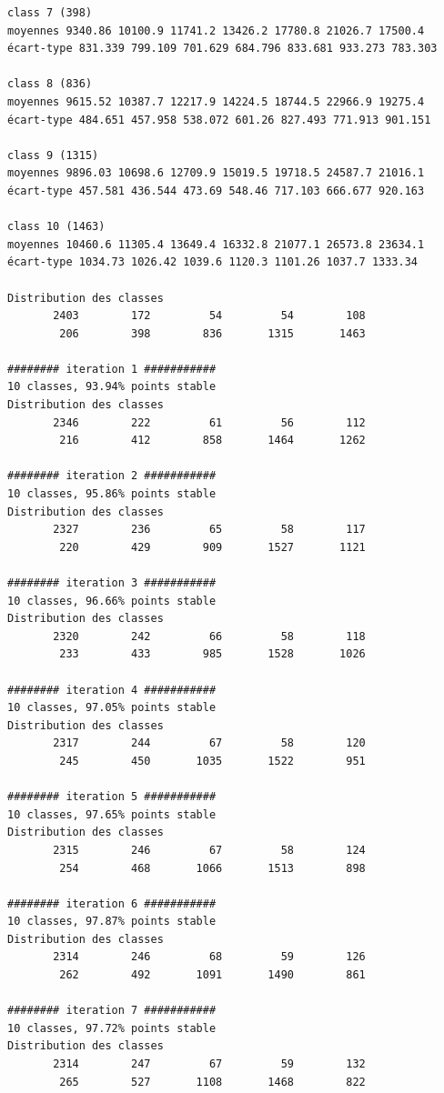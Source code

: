 \documentclass[earth,article,submit,pdftex,moreauthors]{Definitions/mdpi}
\begin{document}
{\begin{scriptsize}
\begin{verbatim}
class 7 (398)
moyennes 9340.86 10100.9 11741.2 13426.2 17780.8 21026.7 17500.4
écart-type 831.339 799.109 701.629 684.796 833.681 933.273 783.303

class 8 (836)
moyennes 9615.52 10387.7 12217.9 14224.5 18744.5 22966.9 19275.4
écart-type 484.651 457.958 538.072 601.26 827.493 771.913 901.151

class 9 (1315)
moyennes 9896.03 10698.6 12709.9 15019.5 19718.5 24587.7 21016.1
écart-type 457.581 436.544 473.69 548.46 717.103 666.677 920.163

class 10 (1463)
moyennes 10460.6 11305.4 13649.4 16332.8 21077.1 26573.8 23634.1
écart-type 1034.73 1026.42 1039.6 1120.3 1101.26 1037.7 1333.34

Distribution des classes
       2403        172         54         54        108
        206        398        836       1315       1463

######## iteration 1 ###########
10 classes, 93.94% points stable
Distribution des classes
       2346        222         61         56        112
        216        412        858       1464       1262

######## iteration 2 ###########
10 classes, 95.86% points stable
Distribution des classes
       2327        236         65         58        117
        220        429        909       1527       1121

######## iteration 3 ###########
10 classes, 96.66% points stable
Distribution des classes
       2320        242         66         58        118
        233        433        985       1528       1026

######## iteration 4 ###########
10 classes, 97.05% points stable
Distribution des classes
       2317        244         67         58        120
        245        450       1035       1522        951

######## iteration 5 ###########
10 classes, 97.65% points stable
Distribution des classes
       2315        246         67         58        124
        254        468       1066       1513        898

######## iteration 6 ###########
10 classes, 97.87% points stable
Distribution des classes
       2314        246         68         59        126
        262        492       1091       1490        861

######## iteration 7 ###########
10 classes, 97.72% points stable
Distribution des classes
       2314        247         67         59        132
        265        527       1108       1468        822


\end{verbatim}
\end{scriptsize}}
\end{document}
